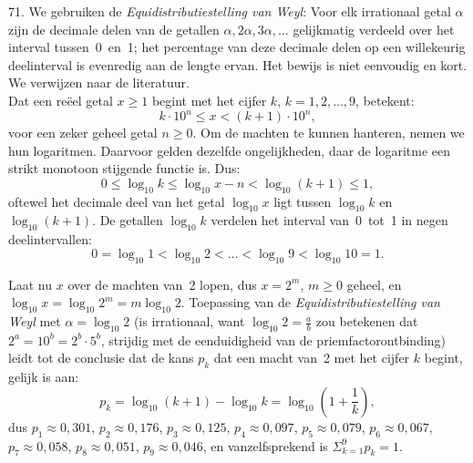 \begin{problem}{71.}
    We gebruiken de \textit{Equidistributiestelling van Weyl}: Voor elk ir\-rationaal getal $\alpha$ zijn de decimale delen van de getallen $\alpha,2 \alpha,3 \alpha,\dotsc$ gelijkmatig verdeeld over het interval tussen~0~en~1; het percentage van deze decimale delen op een willekeurig deelinterval is evenredig aan de lengte ervan. Het bewijs is niet eenvoudig en kort. We verwijzen naar de literatuur.\\

    Dat een reëel getal $x \geq 1$ begint met het cijfer $k$, $k = 1,2,\dotsc,9$, betekent:
    \begin{equation*}
        k \cdot {10}^n \leq x < (k + 1) \cdot {10}^n,
    \end{equation*}
    voor een zeker geheel getal $n \geq 0$. Om de machten te kunnen hanteren, nemen we hun logaritmen. Daarvoor gelden dezelfde ongelijkheden, daar de logaritme een strikt monotoon stijgende functie is. Dus:
    \begin{equation*}
        0 \leq \log_{10} k \leq \log_{10} x - n < \log_{10} (k + 1) \leq 1,
    \end{equation*}
    oftewel het decimale deel van het getal $\log_{10} x$ ligt tussen $\log_{10} k$ en $\log_{10} (k + 1)$. De getallen $\log_{10} k$ verdelen het interval van~0~tot~1 in negen deelintervallen:
    \begin{equation*}
        0 = \log_{10} 1 < \log_{10} 2 < \dots < \log_{10} 9 < \log_{10} 10 = 1.
    \end{equation*}

    Laat nu $x$ over de machten van~2 lopen, dus $x = 2^m$, $m \geq 0$ geheel, en $\log_{10} x = \log_{10} 2^m = m \log_{10} 2$. Toepassing van de \textit{Equidistributie\-stelling van Weyl} met $\alpha = \log_{10} 2$ (is irrationaal, want $\log_{10} 2 = \frac{a}{b}$ zou betekenen dat $2^a = {10}^b = 2^b \cdot 5^b$, strijdig met de eenduidigheid van de priemfactorontbinding) leidt tot de conclusie dat de kans $p_k$ dat een macht van~2 met het cijfer $k$ begint, gelijk is aan:
    \begin{equation*}
        p_k = \log_{10} (k + 1) - \log_{10} k = \log_{10} \left( 1 + \frac{1}{k} \right),
    \end{equation*}
    dus $p_1 \approx 0{,}301$, $p_2 \approx 0{,}176$, $p_3 \approx 0{,}125$, $p_4 \approx 0{,}097$, $p_5 \approx 0{,}079$, $p_6 \approx 0{,}067$, $p_7 \approx 0{,}058$, $p_8 \approx 0{,}051$, $p_9 \approx 0{,}046$, en vanzelfsprekend is $\Sigma_{k=1}^{9} p_k = 1$.
\end{problem}

